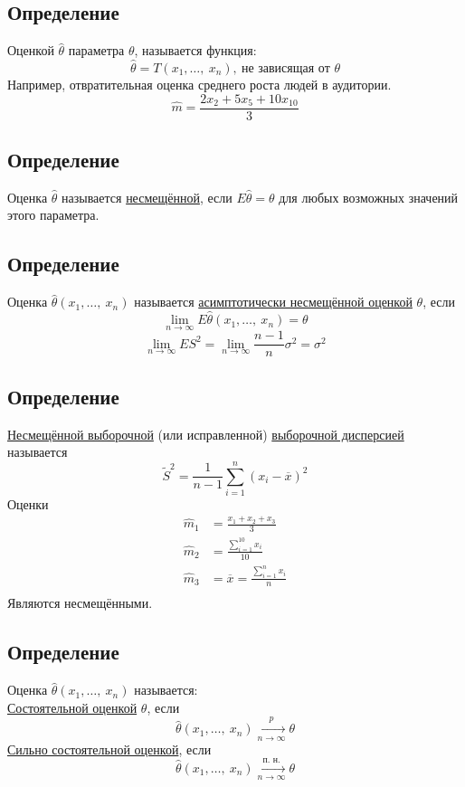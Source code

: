 \documentclass[12pt, a4paper]{article}
\newcommand{\sion}{\sum\limits_{i = 1}^{n}}
\begin{document}
\subsection*{Определение}
Оценкой $\hat{\theta}$ параметра $\theta$, называется функция:
\[\hat{\theta} = T(x_1,\dots,\ x_n),\ \text{не зависящая от $\theta$}\]
Например, отвратительная оценка среднего роста людей в аудитории.
\[\hat{m} = \frac{2x_2 + 5x_5 + 10x_{10}}{3}\]
\subsection*{Определение}
Оценка $\hat{\theta}$ называется \underline{несмещённой}, если $E\hat{\theta} = \theta$ для любых возможных значений этого параметра.
\subsection*{Определение}
Оценка $\hat{\theta}(x_1,\dots,\ x_n)$ называется \underline{асимптотически несмещённой оценкой} $\theta$, если
\[\lim_{n\to\infty} E\hat{\theta}(x_1,\dots,\ x_n) = \theta\]
\[\lim_{n\to\infty} ES^2 = \lim_{n\to\infty} \frac{n - 1}{n}\sigma^2 = \sigma^2\]
\subsection*{Определение}
\underline{Несмещённой выборочной} (или исправленной) \underline{выборочной дисперсией} называется
\[\tilde{S}^2 = \frac{1}{n - 1} \sum_{i = 1}^{n} (x_i - \overline{x})^2\]
Оценки
\[\begin{aligned}
    \hat{m}_1 &= \frac{x_1 + x_2 + x_3}{3}\\
    \hat{m}_2 &= \frac{\sum_{i = 1}^{10} x_i}{10}\\
    \hat{m}_3 &= \overline{x} = \frac{\sion x_i}{n}\\  
\end{aligned}\]
Являются несмещёнными.
\subsection*{Определение}
Оценка $\hat{\theta}(x_1,\dots,\ x_n)$ называется:\\
\underline{Состоятельной оценкой} $\theta$, если
\[\hat{\theta} (x_1,\dots,\ x_n) \xrightarrow[n\to\infty]{p} \theta\]
\underline{Сильно состоятельной оценкой}, если
\[\hat{\theta} (x_1,\dots,\ x_n) \xrightarrow[n\to\infty]{\text{п. н.}} \theta\]
\end{document}
